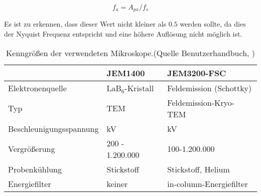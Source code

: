 \begin{equation}
	f_a = A_{px} / f_s \label{freq}
\end{equation}

Es ist zu erkennen, dass dieser Wert nicht kleiner als $0.5$ werden sollte, da dies der Nyquist Frequenz entspricht und eine höhere Auflösung nicht möglich ist.

\begin{table}

	\begin{tabular}[h!]{l l l}
			&	JEM1400	&	JEM3200-FSC\\
		\hline
		Elektronenquelle & LaB$_6$-Kristall & Feldemission (Schottky)\\
		Typ	&	TEM	&	Feldemission-Kryo-TEM\\
		Beschleunigungsspannung & \unit[40-120]{kV} & \unit[100-300]{kV}\\
		Vergrößerung & 200 - 1.200.000 & 100-1.200.000\\
		Probenkühlung & Stickstoff & Stickstoff, Helium\\
		Energiefilter & keiner & in-column-Energiefilter\\
		\hline
		\hline


	\end{tabular}
	\caption[Mikroskopdaten]{Kenngrößen der verwendeten Mikroskope.(Quelle Benutzerhandbuch, \cite{jeol})}
	\label{TEM_tab}
\end{table}

\FloatBarrier